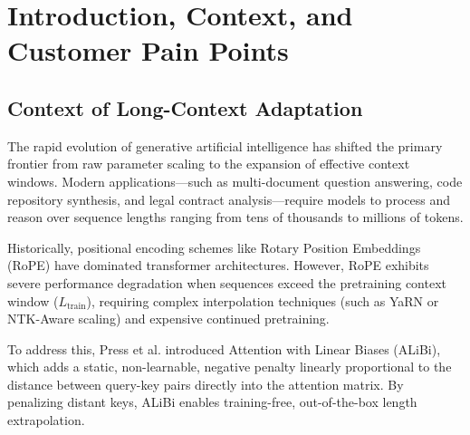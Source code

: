 \documentclass[11pt,journal,compsoc]{IEEEtran}
\begin{document}
\section{Introduction, Context, and Customer Pain Points}
\label{sec:intro}

\subsection{Context of Long-Context Adaptation}
The rapid evolution of generative artificial intelligence has shifted the primary frontier from raw parameter scaling to the expansion of effective context windows. Modern applications—such as multi-document question answering, code repository synthesis, and legal contract analysis—require models to process and reason over sequence lengths ranging from tens of thousands to millions of tokens. 

Historically, positional encoding schemes like Rotary Position Embeddings (RoPE) have dominated transformer architectures. However, RoPE exhibits severe performance degradation when sequences exceed the pretraining context window ($L_{\text{train}}$), requiring complex interpolation techniques (such as YaRN or NTK-Aware scaling) and expensive continued pretraining. 

To address this, Press et al. introduced Attention with Linear Biases (ALiBi), which adds a static, non-learnable, negative penalty linearly proportional to the distance between query-key pairs directly into the attention matrix. By penalizing distant keys, ALiBi enables training-free, out-of-the-box length extrapolation.
\end{document}
